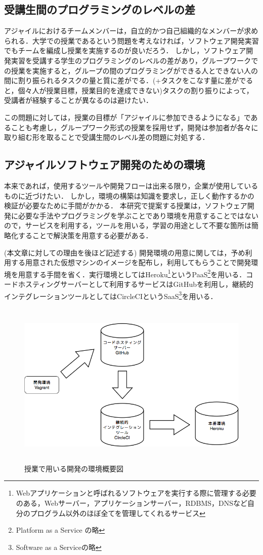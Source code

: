 \subsection{受講生間のプログラミングのレベルの差}

アジャイルにおけるチームメンバーは，自立的かつ自己組織的なメンバーが求められる．大学での授業であるという問題を考えなければ，ソフトウェア開発実習でもチームを編成し授業を実施するのが良いだろう．
しかし，ソフトウェア開発実習を受講する学生のプログラミングのレベルの差があり，グループワークでの授業を実施すると，グループの間のプログラミングができる人とできない人の間に割り振られるタスクの量と質に差がでる．(+タスクをこなす量に差がでると，個々人が授業目標，授業目的を達成できない)タスクの割り振りによって，受講者が経験することが異なるのは避けたい．

この問題に対しては，授業の目標が「アジャイルに参加できるようになる」であることも考慮し，グループワーク形式の授業を採用せず，開発は参加者が各々に取り組む形を取ることで受講生間のレベル差の問題に対処する．

\subsection{アジャイルソフトウェア開発のための環境}

本来であれば，使用するツールや開発フローは出来る限り，企業が使用しているものに近づけたい．
しかし，環境の構築は知識を要求し，正しく動作するかの検証が必要なために手間がかかる．
本研究で提案する授業は，ソフトウェア開発に必要な手法やプログラミングを学ぶことであり環境を用意することではないので，サービスを利用する，ツールを用いる，学習の用途として不要な箇所は簡略化することで解決策を用意する必要がある．

(本文章に対しての理由を後ほど記述する)
開発環境の用意に関しては，予め利用する用意された仮想マシンのイメージを配布し，利用してもらうことで開発環境を用意する手間を省く．実行環境としてはHeroku\footnote{Webアプリケーションと呼ばれるソフトウェアを実行する際に管理する必要のある，Webサーバー，アプリケーションサーバー，RDBMS，DNSなど自分のプログラム以外のほぼ全てを管理してくれるサービス}というPaaS\footnote{Platform as a Service の略}を用いる．コードホスティングサーバーとして利用するサービスはGitHubを利用し，継続的インテグレーションツールとしてはCircleCIというSaaS\footnote{Software as a Serviceの略}を用いる．


\begin{figure}[H]
\centering
\includegraphics[height=8cm]{./assets/images/class_dev_env.png}
\caption{授業で用いる開発の環境概要図}
\label{fig:class_dev_env}
\end{figure}
